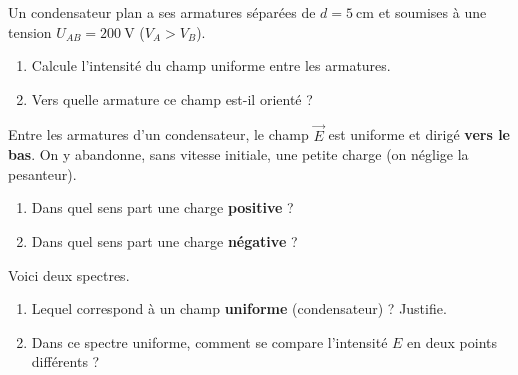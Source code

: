 \documentclass[11pt,a4paper]{article}
\newcommand{\vv}[1]{\vec{#1}}\newcommand{\ds}{\displaystyle}
\begin{document}
\begin{exo}
Un condensateur plan a ses armatures séparées de $d = \SI{5}{\centi\metre}$ et soumises à une tension
$U_{AB} = \SI{200}{\volt}$ ($V_A > V_B$).
\begin{enumerate}[label=\alph*)]
  \item Calcule l'intensité du champ uniforme entre les armatures.
  \item Vers quelle armature ce champ est-il orienté ?
\end{enumerate}
\end{exo}

\begin{exo}
Entre les armatures d'un condensateur, le champ $\vv{E}$ est uniforme et dirigé \textbf{vers le bas}.
On y abandonne, sans vitesse initiale, une petite charge (on néglige la pesanteur).
\begin{enumerate}[label=\alph*)]
  \item Dans quel sens part une charge \textbf{positive} ?
  \item Dans quel sens part une charge \textbf{négative} ?
\end{enumerate}
\end{exo}

\begin{exo}
Voici deux spectres.
\begin{center}
\end{center}
\begin{enumerate}[label=\alph*)]
  \item Lequel correspond à un champ \textbf{uniforme} (condensateur) ? Justifie.
  \item Dans ce spectre uniforme, comment se compare l'intensité $E$ en deux points différents ?
\end{enumerate}
\end{exo}
\end{document}
